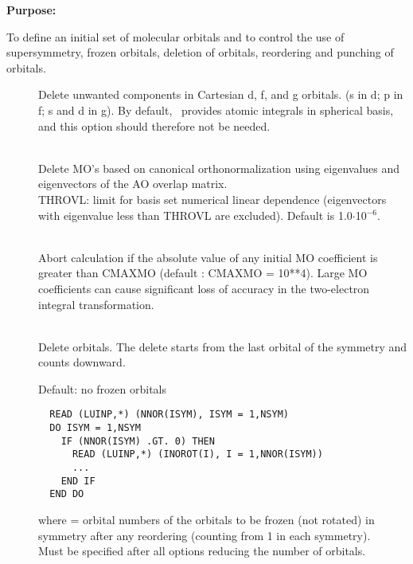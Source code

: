 {\bf Purpose:}

To define an initial set of molecular orbitals
and to control the use of supersymmetry, frozen
orbitals, deletion of orbitals,
reordering and punching of orbitals.

\begin{description}
\item[]
  Delete unwanted components in Cartesian d, f, and g orbitals.
  (s in d; p in f; s and d in g). By default, \her\ provides atomic
  integrals in spherical basis, and this option should therefore not
  be needed.

\item[]
   \\
  Delete MO's based on canonical orthonormalization using eigenvalues
  and eigenvectors of the AO overlap matrix. \\
  THROVL: limit for basis
  set numerical linear dependence (eigenvectors with eigenvalue less
  than THROVL are excluded). Default is 1.0$\cdot$10$^{-6}$.

\item[]
   \\
  Abort calculation if the absolute value of any initial MO coefficient is
  greater than CMAXMO (default : CMAXMO = 10**4).  Large MO coefficients
  can cause significant loss of accuracy in the two-electron integral
  transformation.

\item[]
   \\
  Delete orbitals. The delete starts from the
  last orbital of the symmetry and counts downward.

\item[]
  Default: no frozen orbitals
\begin{verbatim}
  READ (LUINP,*) (NNOR(ISYM), ISYM = 1,NSYM)
  DO ISYM = 1,NSYM
    IF (NNOR(ISYM) .GT. 0) THEN
      READ (LUINP,*) (INOROT(I), I = 1,NNOR(ISYM))
      ...
    END IF
  END DO
\end{verbatim}
  where  = orbital numbers of the orbitals to be
          frozen
          (not rotated) in symmetry 
          after any reordering (counting from 1 in each symmetry).\\
  Must be specified after all options reducing the number of orbitals.


\end{description}
